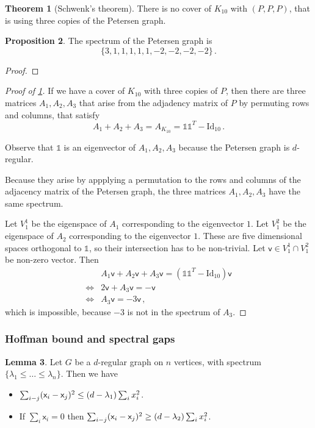 \documentclass[12pt]{amsart}
\theoremstyle{definition}
\newtheorem{thm}{Theorem}[section]
\newtheorem{prop}[thm]{Proposition}
\newtheorem{lm}[thm]{Lemma}
\newcommand{\vv}{\mathsf{v}}
\newcommand{\vx}{\mathsf{x}}
\newcommand{\Id}{\mathrm{Id}}
\begin{document}
\begin{thm}[Schwenk's theorem]\label{thm:schwenk}
There is no cover of $K_{10}$ with $(P, P, P)$, that is using three copies of the Petersen graph.
\end{thm}


\begin{prop}
The spectrum of the Petersen graph is 
$$ \{ 3, 1, 1, 1, 1, 1, -2, -2, -2, -2 \} \, .$$
\end{prop}

\begin{proof}

\end{proof}

\begin{proof}[Proof of \cref{thm:schwenk}]
If we have a cover of $K_{10}$ with three copies of $P$, then there are three matrices $A_1, A_2, A_3$ that arise from the adjadency matrix of $P$ by permuting rows and columns, that satisfy
$$A_1 + A_2 + A_3 = A_{K_{10}} = \mathbb{1}\mathbb{1}^T - \Id_{10}\, . $$

Observe that $\mathbb{1}$ is an eigenvector of $A_1, A_2, A_3$ because the Petersen graph is $d$-regular.

Because they arise by appplying a permutation to the rows and columns of the adjacency matrix of the Petersen graph, the three matrices $A_1, A_2, A_3 $ have the same spectrum.

Let $V^1_1$ be the eigenspace of $A_1$ corresponding to the eigenvector $1$.
Let $V^2_1$ be the eigenspace of $A_2$ corresponding to the eigenvector $1$.
These are five dimensional spaces orthogonal to $\mathbb{1}$, so their intersection has to be non-trivial.
Let $\vv \in V^1_1 \cap V^2_1$ be non-zero vector.
Then
\begin{align*}
& A_1 \vv + A_2 \vv + A_3 \vv  = (\mathbb{1}\mathbb{1}^T - \Id_{10}) \vv \\
\Leftrightarrow & 2 \vv + A_3 \vv = - \vv \\
\Leftrightarrow & A_3 \vv = - 3 \vv \, ,
\end{align*}
which is impossible, because $-3$ is not in the spectrum of $A_3$.
\end{proof}


\subsubsection*{Hoffman bound and spectral gaps}


\begin{lm}\label{lm:spectral_ineq}
Let $G$ be a $d$-regular graph on $n$ vertices, with spectrum $\{ \lambda_1 \leq \ldots \leq \lambda_n\}$.
Then we have
\begin{itemize}
\item $\sum_{i \-- j} (\vx_i - \vx_j)^2 \leq (d - \lambda_1)\sum_i x_i^2$.

\item If $\sum_i \vx_i = 0$ then $\sum_{i \-- j} (\vx_i - \vx_j)^2 \geq (d - \lambda_2)\sum_i x_i^2$.
\end{itemize}
\end{lm}
\end{document}
